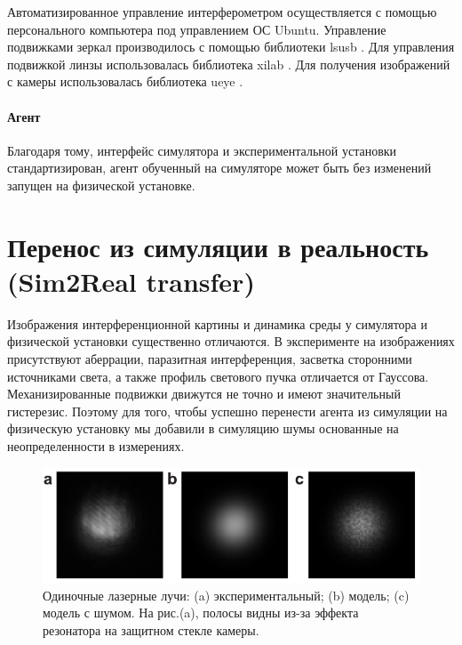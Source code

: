 Автоматизированное управление интерферометром осуществляется с помощью персонального компьютера под управлением ОС Ubuntu. Управление подвижками зеркал производилось с помощью библиотеки lsusb \cite{lsusb}. Для управления подвижкой линзы использовалась библиотека xilab \cite{standa_soft}. Для получения изображений с камеры использовалась библиотека ueye \cite{ids_soft}. 


\paragraph{Агент}

Благодаря тому, интерфейс симулятора и экспериментальной установки стандартизирован, агент обученный на симуляторе может быть без изменений запущен на физической установке. 


\section{Перенос из симуляции в реальность (Sim2Real transfer)}

Изображения интерференционной картины и динамика среды у симулятора и физической установки существенно отличаются. В эксперименте на изображениях присутствуют аберрации, паразитная интерференция, засветка сторонними источниками света, а также профиль светового пучка отличается от Гауссова. Механизированные подвижки движутся не точно и имеют значительный гистерезис. Поэтому для того, чтобы успешно перенести агента из симуляции на физическую установку  мы добавили в симуляцию шумы основанные на неопределенности в измерениях.

\begin{figure}
\centering
  \includegraphics[width=0.8\linewidth]{images/beamsamples.pdf}

\caption{Одиночные лазерные лучи: (a) экспериментальный; (b) модель; (c) модель с шумом. На рис.(a), полосы видны из-за эффекта резонатора на защитном стекле камеры.}
\label{fig:rad_fit}
\end{figure}


